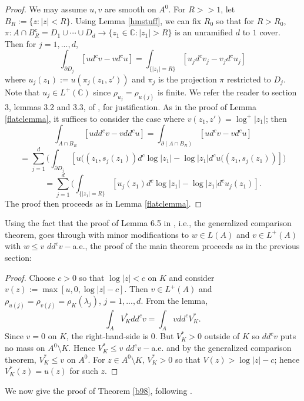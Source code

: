 \documentclass[12pt]{article}
\numberwithin{equation}{section}
\newcommand{\C}{\mathbb{C}}
\begin{document}
\begin{proof} We may assume $u,v$ are smooth on $A^0$. For $R>>1$, let $B_R:=\{z:|z|<R\}$. Using Lemma \ref{hmstuff}, we can fix $R_0$ so that for $R>R_0$, $\pi:A\cap B_R^c=D_1\cup \cdots \cup D_d \to \{z_1\in \C: |z_1|>R\}$ is an unramified $d$ to $1$ cover. Then for $j=1,...,d$, 
$$\int_{\partial D_j} [ud^cv-vd^cu]= \int_{\{|z_1|=R\}}  [u_j d^c v_j -v_j d^c u_j]$$ where $u_j(z_1):= u(\pi_j(z_1,z'))$ and $\pi_j$ is the projection $\pi$ restricted to $D_j$. Note that $u_j\in L^+(\C)$ since $\rho_{u_j}= \rho_{u(j)}$ is finite. We refer the reader to section 3, lemmas 3.2 and 3.3, of \cite{HM}, for justification. As in the proof of Lemma \ref{flatclemma}, it suffices to consider the case where  $v(z_1,z')=\log^+|z_1|$; then 
$$\int_{A\cap B_R} [udd^cv-vdd^cu]=\int_{\partial (A\cap B_R)} [ud^cv-vd^cu]$$
$$=\sum_{j=1}^d \bigl(\int_{\partial D_j} [u((z_1,s_j(z_1))d^c\log |z_1|-\log |z_1|d^cu((z_1,s_j(z_1))]\bigr)$$
$$=\sum_{j=1}^d \bigl(\int_{\{|z_1|=R\}} [u_j(z_1)d^c\log |z_1|-\log |z_1|d^cu_j(z_1)].$$
The proof then proceeds as in Lemma \ref{flatclemma}.

\end{proof} 


Using the fact that the proof of Lemma 6.5 in \cite{BT}, i.e., the generalized comparison theorem, goes through with minor modifications to $w\in L(A)$ and 
$v\in L^+(A)$ with $w\leq v$ $dd^cv-$a.e., the proof of the main theorem proceeds as in the previous section:

\begin{proof} Choose $c>0$ so that $\log|z| < c$ on $K$ and consider $v(z):=\max[u,0,\log |z|-c]$. Then $v\in L^+(A)$ and $\rho_{u(j)}= \rho_{v(j)}=\rho_K(\lambda_j)$, $j=1,...,d$. From the lemma, 
$$\int_{A} V_K^* dd^c v =  \int_{A} v dd^cV_K^*.$$
Since $v=0$ on $K$, the right-hand-side is $0$. But $V_K^*>0$ outside of $K$ so $dd^c v$ puts no mass on $A^0 \setminus K$. Hence 
$V_K^* \leq v$ $dd^cv-$a.e. and by the generalized comparison theorem, $V_K^* \leq v$ on $A^0$. For $z\in A^0 \setminus K$, $V_K^* >0$ so that 
$V(z)> \log |z| - c$; hence $V_K^*(z)=u(z)$ for such $z$.


\end{proof}

We now give the proof of Theorem \ref{b98}, following \cite{B98}.
\end{document}
